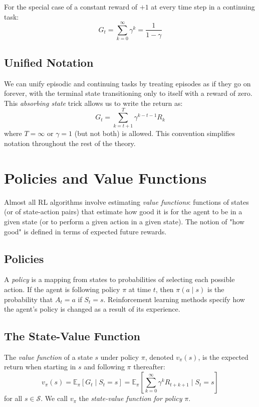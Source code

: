 \documentclass[12pt]{article}
\begin{document}
For the special case of a constant reward of $+1$ at every time step in a continuing task:
\begin{equation}
G_t = \sum_{k=0}^{\infty} \gamma^k = \frac{1}{1 - \gamma}
\end{equation}

\subsection{Unified Notation}

We can unify episodic and continuing tasks by treating episodes as if they go on forever, with the terminal state transitioning only to itself with a reward of zero. This \textit{absorbing state} trick allows us to write the return as:
\begin{equation}
G_t = \sum_{k=t+1}^{T} \gamma^{k-t-1} R_k
\end{equation}
where $T = \infty$ or $\gamma = 1$ (but not both) is allowed. This convention simplifies notation throughout the rest of the theory.

\section{Policies and Value Functions}

Almost all RL algorithms involve estimating \textit{value functions}: functions of states (or of state-action pairs) that estimate how good it is for the agent to be in a given state (or to perform a given action in a given state). The notion of "how good" is defined in terms of expected future rewards.

\subsection{Policies}

A \textit{policy} is a mapping from states to probabilities of selecting each possible action. If the agent is following policy $\pi$ at time $t$, then $\pi(a \mid s)$ is the probability that $A_t = a$ if $S_t = s$. Reinforcement learning methods specify how the agent's policy is changed as a result of its experience.

\subsection{The State-Value Function}

The \textit{value function} of a state $s$ under policy $\pi$, denoted $v_\pi(s)$, is the expected return when starting in $s$ and following $\pi$ thereafter:
\begin{equation}
v_\pi(s) = \mathbb{E}_\pi[G_t \mid S_t = s] = \mathbb{E}_\pi\left[\sum_{k=0}^{\infty} \gamma^k R_{t+k+1} \mid S_t = s\right]
\end{equation}
for all $s \in \mathcal{S}$. We call $v_\pi$ the \textit{state-value function for policy} $\pi$.
\end{document}
